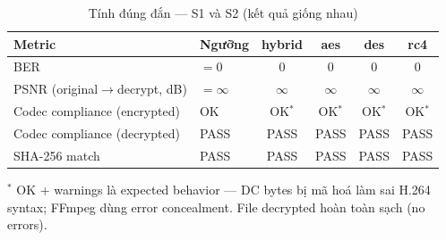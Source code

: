 \begin{table}[ht]
\centering
\caption{Tính đúng đắn — S1 và S2 (kết quả giống nhau)}
\label{tab:correctness}
\begin{tabular}{|l|l|c|c|c|c|}
\hline
\textbf{Metric} & \textbf{Ngưỡng} & \textbf{hybrid} & \textbf{aes} & \textbf{des} & \textbf{rc4} \\
\hline
BER & $= 0$ & 0 & 0 & 0 & 0 \\
\hline
PSNR (original$\to$decrypt, dB) & $= \infty$ & $\infty$ & $\infty$ & $\infty$ & $\infty$ \\
\hline
Codec compliance (encrypted) & OK & OK$^*$ & OK$^*$ & OK$^*$ & OK$^*$ \\
\hline
Codec compliance (decrypted) & PASS & PASS & PASS & PASS & PASS \\
\hline
SHA-256 match & PASS & PASS & PASS & PASS & PASS \\
\hline
\end{tabular}
\begin{tablenotes}
\small
\item $^*$ OK + warnings là expected behavior — DC bytes bị mã hoá làm sai H.264 syntax;
FFmpeg dùng error concealment. File decrypted hoàn toàn sạch (no errors).
\end{tablenotes}
\end{table}
